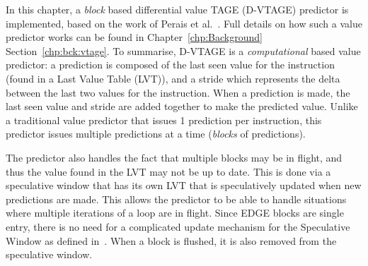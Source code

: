 In this chapter, a \textit{block} based differential value TAGE (D-VTAGE) predictor is implemented, based on the work of Perais et al.~\cite{peraisBeBop2015}.
Full details on how such a value predictor works can be found in Chapter~\ref{chp:Background} Section~\ref{chp:bck:vtage}.
To summarise, D-VTAGE is a \textit{computational} based value predictor: a prediction is composed of the last seen value for the instruction (found in a Last Value Table (LVT)), and a stride which represents the delta between the last two values for the instruction.
When a prediction is made, the last seen value and stride are added together to make the predicted value.
Unlike a traditional value predictor that issues 1 prediction per instruction, this predictor issues multiple predictions at a time (\textit{blocks} of predictions).

The predictor also handles the fact that multiple blocks may be in flight, and thus the value found in the LVT may not be up to date.
This is done via a speculative window that has its own LVT that is speculatively updated when new predictions are made.
This allows the predictor to be able to handle situations where multiple iterations of a loop are in flight.
Since EDGE blocks are single entry, there is no need for a complicated update mechanism for the Speculative Window as defined in~\cite{peraisBeBop2015}.
When a block is flushed, it is also removed from the speculative window.





